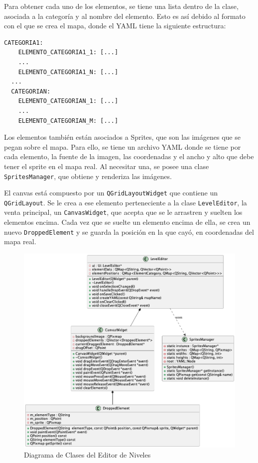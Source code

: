 \documentclass[titlepage,a4paper]{article}
\begin{document}
Para obtener cada uno de los elementos, se tiene una lista dentro de la clase, asociada a la categoría y al nombre del elemento. Esto es así debido al formato con el que se crea el mapa, donde el YAML tiene la siguiente estructura:

\begin{lstlisting}[captionpos=b, caption=Ejemplo de formato YAML del mapa]
  CATEGORIA1:
    ELEMENTO_CATEGORIA1_1: [...]
    ...
    ELEMENTO_CATEGORIA1_N: [...]
  ...
  CATEGORIAN:
    ELEMENTO_CATEGORIAN_1: [...]
    ...
    ELEMENTO_CATEGORIAN_M: [...] 
\end{lstlisting}

Los elementos también están asociados a Sprites, que son las imágenes que se pegan sobre el mapa. Para ello, se tiene un archivo YAML donde se tiene por cada elemento, la fuente de la imagen, las coordenadas y el ancho y alto que debe tener el sprite en el mapa real. Al necesitar una, se posee una clase \texttt{SpritesManager}, que obtiene y renderiza las imágenes.

El canvas está compuesto por un \texttt{QGridLayoutWidget} que contiene un \texttt{QGridLayout}. Se le crea a ese elemento perteneciente a la clase \texttt{LevelEditor}, la venta principal, un \texttt{CanvasWidget}, que acepta que se le arrastren y suelten los elementos encima. Cada vez que se suelte un elemento encima de ella, se crea un nuevo \texttt{DroppedElement} y se guarda la posición en la que cayó, en coordenadas del mapa real.

\begin{figure}[H]
  \centering
  \includegraphics[scale=0.4]{images/Level Editor.png}
  \caption{Diagrama de Clases del Editor de Niveles}
  \label{fig:editor}
\end{figure}
\end{document}
